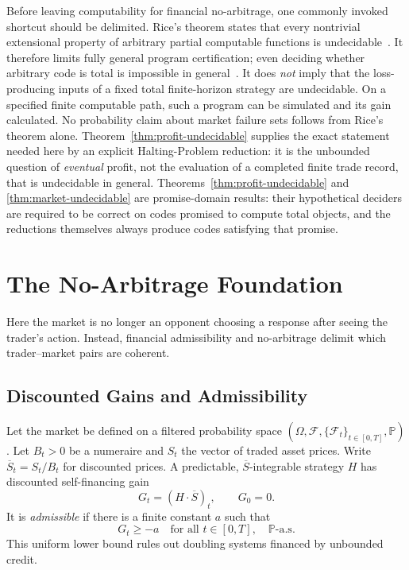 \documentclass[aps,pra,reprint,superscriptaddress,amsmath,amssymb,floatfix]{revtex4-2}
\theoremstyle{plain}
\theoremstyle{definition}
\theoremstyle{remark}
\begin{document}
Before leaving computability for financial no-arbitrage, one commonly invoked
shortcut should be delimited.
Rice's theorem states that every nontrivial extensional property of arbitrary
partial computable functions is undecidable~\cite{Rice-1953}. It therefore
limits fully general program certification; even deciding whether arbitrary
code is total is impossible in general~\cite{turing-36}. It does \emph{not}
imply that the loss-producing inputs of a fixed total finite-horizon strategy
are undecidable. On a specified finite computable path, such a program can be
simulated and its gain calculated. No probability claim about market failure
sets follows from Rice's theorem alone. Theorem~\ref{thm:profit-undecidable}
supplies the exact statement needed here by an explicit Halting-Problem
reduction: it is the unbounded question of \emph{eventual} profit, not the
evaluation of a completed finite trade record, that is undecidable in general.
Theorems~\ref{thm:profit-undecidable} and
\ref{thm:market-undecidable} are promise-domain results: their hypothetical
deciders are required to be correct on codes promised to compute total
objects, and the reductions themselves always produce codes satisfying that
promise.

\section{The No-Arbitrage Foundation}
\label{sec:noarb}

Here the market is no longer an opponent choosing a response after seeing the
trader's action. Instead, financial admissibility and no-arbitrage delimit
which trader--market pairs are coherent.

\subsection{Discounted Gains and Admissibility}

Let the market be defined on a filtered probability space
\((\Omega,\mathcal{F},\{\mathcal{F}_t\}_{t\in[0,T]},\mathbb{P})\).
Let \(B_t>0\) be a numeraire and \(S_t\) the vector of traded asset prices.
Write \(\overline S_t=S_t/B_t\) for discounted prices. A predictable,
\(\overline S\)-integrable strategy \(H\) has discounted self-financing gain
\begin{equation}
  G_t=(H\mathbin{\cdot}\overline S)_t,\qquad G_0=0.
  \label{eq:gain}
\end{equation}
It is \emph{admissible} if there is a finite constant \(a\) such that
\begin{equation}
  G_t\geq -a\quad\text{for all }t\in[0,T],\quad\mathbb{P}\text{-a.s.}
  \label{eq:admissible}
\end{equation}
This uniform lower bound rules out doubling systems financed by unbounded
credit.
\end{document}
